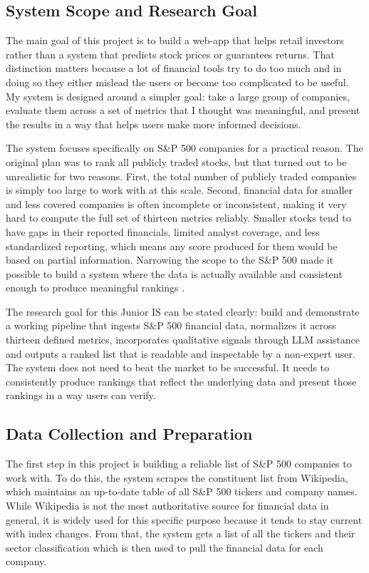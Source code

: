 \documentclass[12pt]{article}
\begin{document}
\subsection{System Scope and Research Goal}
The main goal of this project is to build a web-app that helps retail investors rather than a system that predicts stock prices or guarantees returns. That distinction matters because a lot of financial tools try to do too much and in doing so they either mislead the users or become too complicated to be useful. My system is designed around a simpler goal: take a large group of companies, evaluate them across a set of metrics that I thought was meaningful, and present the results in a way that helps users make more informed decisions.

The system focuses specifically on S\&P 500 companies for a practical reason. The original plan was to rank all publicly traded stocks, but that turned out to be unrealistic for two reasons. First, the total number of publicly traded companies is simply too large to work with at this scale. Second, financial data for smaller and less covered companies is often incomplete or inconsistent, making it very hard to compute the full set of thirteen metrics reliably. Smaller stocks tend to have gaps in their reported financials, limited analyst coverage, and less standardized reporting, which means any score produced for them would be based on partial information. Narrowing the scope to the S\&P 500 made it possible to build a system where the data is actually available and consistent enough to produce meaningful rankings \cite{SPGlobal2016Methodology}.

The research goal for this Junior IS can be stated clearly: build and demonstrate a working pipeline that ingests S\&P 500 financial data, normalizes it across thirteen defined metrics, incorporates qualitative signals through LLM assistance and outputs a ranked list that is readable and inspectable by a non-expert user. The system does not need to beat the market to be successful. It needs to consistently produce rankings that reflect the underlying data and present those rankings in a way users can verify.

\subsection{Data Collection and Preparation}
The first step in this project is building a reliable list of S\&P 500 companies to work with. To do this, the system scrapes the constituent list from Wikipedia, which maintains an up-to-date table of all S\&P 500 tickers and company names. While Wikipedia is not the most authoritative source for financial data in general, it is widely used for this specific purpose because it tends to stay current with index changes. From that, the system gets a list of all the tickers and their sector classification which is then used to pull the financial data for each company.
\end{document}
